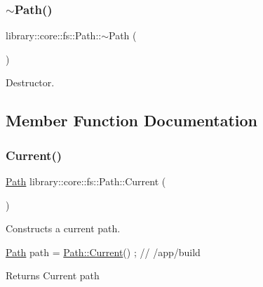 \subsubsection{\texorpdfstring{$\sim$\+Path()}{~Path()}}
{\footnotesize\ttfamily library\+::core\+::fs\+::\+Path\+::$\sim$\+Path (\begin{DoxyParamCaption}{ }\end{DoxyParamCaption})}



Destructor. 



\subsection{Member Function Documentation}
\mbox{\label{classlibrary_1_1core_1_1fs_1_1_path_adbdaa4e7ab2a1b399746782668863e53}} 
\subsubsection{\texorpdfstring{Current()}{Current()}}
{\footnotesize\ttfamily \hyperlink{classlibrary_1_1core_1_1fs_1_1_path}{Path} library\+::core\+::fs\+::\+Path\+::\+Current (\begin{DoxyParamCaption}{ }\end{DoxyParamCaption})\hspace{0.3cm}{\ttfamily [static]}}



Constructs a current path. 


\begin{DoxyCode}
\hyperlink{classlibrary_1_1core_1_1fs_1_1_path_aabc4240fc08479d1bff6b9753f2b5cc2}{Path} path = \hyperlink{classlibrary_1_1core_1_1fs_1_1_path_adbdaa4e7ab2a1b399746782668863e53}{Path::Current}() ; \textcolor{comment}{// /app/build}
\end{DoxyCode}


\begin{DoxyReturn}{Returns}
Current path 
\end{DoxyReturn}
\mbox{\label{classlibrary_1_1core_1_1fs_1_1_path_a3a4c995e4b1ca0f26abbf65d3a244446}} 
